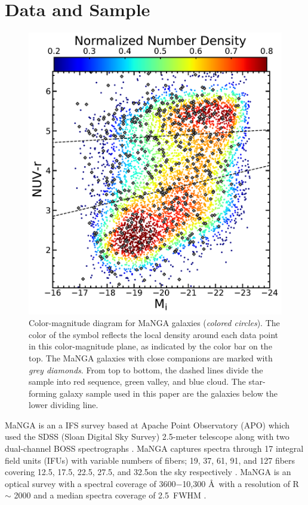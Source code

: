 \documentclass[iop,revtex4,twocolumn,apj,numberedappendix,appendixfloats]{emulateapj}
\begin{document}
\section{Data and Sample}\label{sec:data}

\begin{figure}
\centering
\includegraphics[width=\linewidth]{fig/color-mag.pdf}
\caption[]{Color-magnitude diagram for MaNGA galaxies ({\it colored circles}). The color of the symbol reflects the local density around each data point in this color-magnitude plane, as indicated by the color bar on the top. The MaNGA galaxies with close companions are marked with {\it grey diamonds}. From top to bottom, the dashed lines divide the sample into red sequence, green valley, and blue cloud. The star-forming galaxy sample used in this paper are the galaxies below the lower dividing line.}
\label{fig:cmd}
\end{figure}

MaNGA is an a IFS survey based at Apache Point Observatory (APO) which used the SDSS (Sloan Digital Sky Survey) 2.5-meter telescope along with two dual-channel BOSS spectrographs \citep{Drory:2015}. MaNGA captures spectra through 17 integral field units (IFUs) with variable numbers of fibers; 19, 37, 61, 91, and 127 fibers covering 12.5\arcsec, 17.5\arcsec, 22.5\arcsec, 27.5\arcsec, and 32.5\arcsec on the sky respectively \citet{Law:2015}. MaNGA is an optical survey with a spectral coverage of 3600$-$10,300 \AA\ with a resolution of R $\sim$ 2000 and a median spectra coverage of 2.5\arcsec\ FWHM \citep{Bundy:2015}. 
\end{document}
